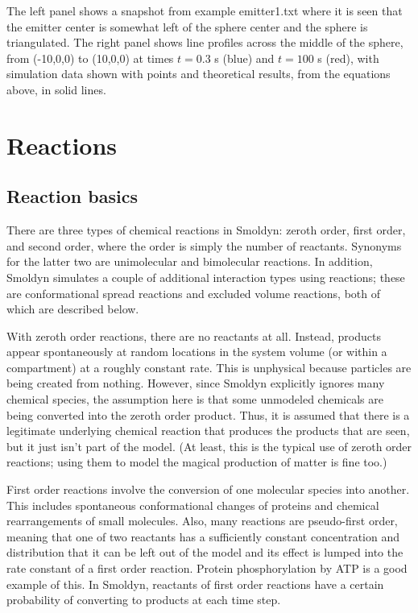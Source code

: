 \documentclass {scrbook}
\begin{document}
The left panel shows a snapshot from example emitter1.txt where it is seen that the emitter center is somewhat left of the sphere center and the sphere is triangulated. The right panel shows line profiles across the middle of the sphere, from (-10,0,0) to (10,0,0) at times $t = 0.3$ s (blue) and $t = 100$ s (red), with simulation data shown with points and theoretical results, from the equations above, in solid lines.


\chapter{Reactions}

\section{Reaction basics}

There are three types of chemical reactions in Smoldyn: zeroth order, first order, and second order, where the order is simply the number of reactants. Synonyms for the latter two are unimolecular and bimolecular reactions. In addition, Smoldyn simulates a couple of additional interaction types using reactions; these are conformational spread reactions and excluded volume reactions, both of which are described below.

With zeroth order reactions, there are no reactants at all. Instead, products appear spontaneously at random locations in the system volume (or within a compartment) at a roughly constant rate. This is unphysical because particles are being created from nothing. However, since Smoldyn explicitly ignores many chemical species, the assumption here is that some unmodeled chemicals are being converted into the zeroth order product. Thus, it is assumed that there is a legitimate underlying chemical reaction that produces the products that are seen, but it just isn't part of the model. (At least, this is the typical use of zeroth order reactions; using them to model the magical production of matter is fine too.)

First order reactions involve the conversion of one molecular species into another. This includes spontaneous conformational changes of proteins and chemical rearrangements of small molecules. Also, many reactions are pseudo-first order, meaning that one of two reactants has a sufficiently constant concentration and distribution that it can be left out of the model and its effect is lumped into the rate constant of a first order reaction. Protein phosphorylation by ATP is a good example of this. In Smoldyn, reactants of first order reactions have a certain probability of converting to products at each time step.
\end{document}
